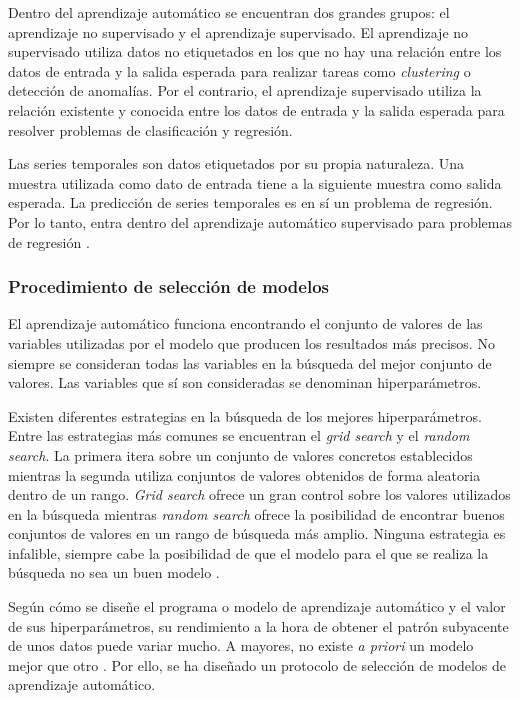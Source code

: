 Dentro del aprendizaje automático se encuentran dos grandes grupos: el aprendizaje no supervisado y el aprendizaje supervisado. El aprendizaje no supervisado utiliza datos no etiquetados en los que no hay una relación entre los datos de entrada y la salida esperada para realizar tareas como \textit{clustering} o detección de anomalías. Por el contrario, el aprendizaje supervisado utiliza la relación existente y conocida entre los datos de entrada y la salida esperada para resolver problemas de clasificación y regresión.

Las series temporales son datos etiquetados por su propia naturaleza. Una muestra utilizada como dato de entrada tiene a la siguiente muestra como salida esperada. La predicción de series temporales es en sí un problema de regresión. Por lo tanto, entra dentro del aprendizaje automático supervisado para problemas de regresión \cite{validationsource}.

\subsubsection{Procedimiento de selección de modelos}
El aprendizaje automático funciona encontrando el conjunto de valores de las variables utilizadas por el modelo que producen los resultados más precisos. No siempre se consideran todas las variables en la búsqueda del mejor conjunto de valores. Las variables que sí son consideradas se denominan hiperparámetros.

Existen diferentes estrategias en la búsqueda de los mejores hiperparámetros. Entre las estrategias más comunes se encuentran el \textit{grid search} y el \textit{random search}. La primera itera sobre un conjunto de valores concretos establecidos mientras la segunda utiliza conjuntos de valores obtenidos de forma aleatoria dentro de un rango. \textit{Grid search} ofrece un gran control sobre los valores utilizados en la búsqueda mientras \textit{random search} ofrece la posibilidad de encontrar buenos conjuntos de valores en un rango de búsqueda más amplio. Ninguna estrategia es infalible, siempre cabe la posibilidad de que el modelo para el que se realiza la búsqueda no sea un buen modelo \cite{randomsearch}.

Según cómo se diseñe el programa o modelo de aprendizaje automático y el valor de sus hiperparámetros, su rendimiento a la hora de obtener el patrón subyacente de unos datos puede variar mucho. A mayores, no existe \textit{a priori} un modelo mejor que otro \cite{nofreelunch}. Por ello, se ha diseñado un protocolo de selección de modelos de aprendizaje automático.

